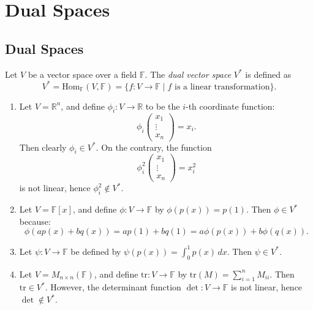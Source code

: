 \chapter{Dual Spaces}
\section{Dual Spaces}
\begin{definition}\label{def:dual-space}
Let $V$ be a vector space over a field $\mathbb{F}$. The \emph{dual vector space} $V^*$ is defined as
\[
V^* = \mathrm{Hom}_{\mathbb{F}}(V, \mathbb{F}) = \{ f : V \to \mathbb{F} \mid f \text{ is a linear transformation} \}.
\]
\end{definition}

\begin{example}
\leavevmode
\begin{enumerate}
  \item Let $V = \mathbb{R}^n$, and define $\phi_i : V \to \mathbb{R}$ to be the $i$-th coordinate function:
  \[
  \phi_i \begin{pmatrix} x_1 \\ \vdots \\ x_n \end{pmatrix} = x_i.
  \]
  Then clearly $\phi_i \in V^*$. On the contrary, the function
  \[
  \phi_i^2 \begin{pmatrix} x_1 \\ \vdots \\ x_n \end{pmatrix} = x_i^2
  \]
  is not linear, hence $\phi_i^2 \notin V^*$.

  \item Let $V = \mathbb{F}[x]$, and define $\phi : V \to \mathbb{F}$ by $\phi(p(x)) = p(1)$. Then $\phi \in V^*$ because:
  \[
  \phi(ap(x) + bq(x)) = ap(1) + bq(1) = a \phi(p(x)) + b \phi(q(x)).
  \]

  \item Let $\psi : V \to \mathbb{F}$ be defined by $\psi(p(x)) = \int_0^1 p(x)\,dx$. Then $\psi \in V^*$.

  \item Let $V = M_{n \times n}(\mathbb{F})$, and define $\mathrm{tr} : V \to \mathbb{F}$ by $\mathrm{tr}(M) = \sum_{i=1}^n M_{ii}$. Then $\mathrm{tr} \in V^*$. However, the determinant function $\det : V \to \mathbb{F}$ is not linear, hence $\det \notin V^*$.
\end{enumerate}
\end{example}

